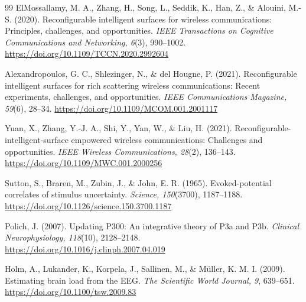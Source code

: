 \documentclass{BVP_CINC}
\begin{document}
\begin{thebibliography}{99}
 ElMossallamy, M. A., Zhang, H., Song, L., Seddik, K., Han, Z., \& Alouini, M.-S. (2020). Reconfigurable intelligent surfaces for wireless communications: Principles, challenges, and opportunities. \textit{IEEE Transactions on Cognitive Communications and Networking, 6}(3), 990--1002. \url{https://doi.org/10.1109/TCCN.2020.2992604}

 Alexandropoulos, G. C., Shlezinger, N., \& del Hougne, P. (2021). Reconfigurable intelligent surfaces for rich scattering wireless communications: Recent experiments, challenges, and opportunities. \textit{IEEE Communications Magazine, 59}(6), 28--34. \url{https://doi.org/10.1109/MCOM.001.2001117}

 Yuan, X., Zhang, Y.-J. A., Shi, Y., Yan, W., \& Liu, H. (2021). Reconfigurable-intelligent-surface empowered wireless communications: Challenges and opportunities. \textit{IEEE Wireless Communications, 28}(2), 136--143. \url{https://doi.org/10.1109/MWC.001.2000256}

 Sutton, S., Braren, M., Zubin, J., \& John, E. R. (1965). Evoked-potential correlates of stimulus uncertainty. \textit{Science, 150}(3700), 1187--1188. \url{https://doi.org/10.1126/science.150.3700.1187}

 Polich, J. (2007). Updating P300: An integrative theory of P3a and P3b. \textit{Clinical Neurophysiology, 118}(10), 2128--2148. \url{https://doi.org/10.1016/j.clinph.2007.04.019}

 Holm, A., Lukander, K., Korpela, J., Sallinen, M., \& Müller, K. M. I. (2009). Estimating brain load from the EEG. \textit{The Scientific World Journal, 9}, 639--651. \url{https://doi.org/10.1100/tsw.2009.83}

\end{thebibliography}
\end{document}
